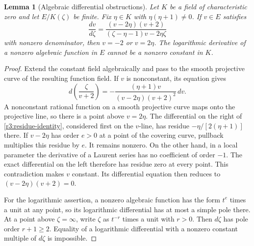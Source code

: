 \documentclass[11pt,a4paper]{article}
\numberwithin{equation}{section}
\theoremstyle{plain}
\newtheorem{lemma}[theorem]{Lemma}
\theoremstyle{definition}
\theoremstyle{remark}
\begin{document}
\begin{lemma}[Algebraic differential obstructions]\label{r3logic:residue}
Let $K$ be a field of characteristic zero and let $E/K(\zeta)$ be
finite. Fix $\eta\in K$ with $\eta(\eta+1)\ne0$. If $v\in E$ satisfies
\[
 \frac{dv}{d\zeta}=
 \frac{(v-2\eta)(v+2)}{(\zeta-\eta-1)v-2\eta\zeta}
\]
with nonzero denominator, then $v=-2$ or $v=2\eta$.
The logarithmic derivative of a nonzero algebraic function in $E$
cannot be a nonzero constant in $K$.
\end{lemma}
\begin{proof}
Extend the constant field algebraically and pass to the smooth
projective curve of the resulting function field. If $v$ is nonconstant, its equation gives
\begin{equation}\label{r3:residue-identity}
 d\left(\frac{\zeta}{v+2}\right)
 =-\frac{(\eta+1)v}{(v-2\eta)(v+2)^2}\,dv.
\end{equation}
A nonconstant rational function on a smooth projective curve
maps onto the projective line, so there is a point above
$v=2\eta$. The differential on the right of
\eqref{r3:residue-identity}, considered first on the $v$-line, has
residue $-\eta/[2(\eta+1)]$ there. If $v-2\eta$ has order $e>0$
at a point of the covering curve, pullback multiplies this residue
by $e$. It remains nonzero. On the other hand, in a local
parameter the derivative of a Laurent series has no coefficient
of order $-1$. The exact differential on the left therefore has
residue zero at every point. This contradiction makes $v$
constant. Its differential equation then reduces to
$(v-2\eta)(v+2)=0$.

For the logarithmic assertion, a nonzero algebraic function has
the form $t^e$ times a unit at any point, so its logarithmic
differential has at most a simple pole there. At a point above
$\zeta=\infty$, write $\zeta$ as $t^{-r}$ times a unit with $r>0$.
Then $d\zeta$ has pole order $r+1\ge2$. Equality of a logarithmic
differential with a nonzero constant multiple of $d\zeta$ is
impossible.
\end{proof}
\end{document}
